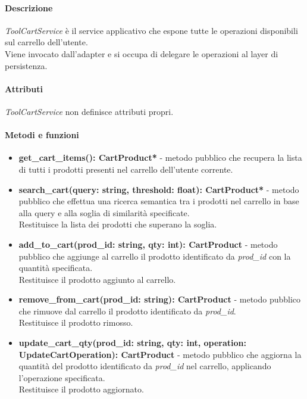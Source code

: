 \paragraph{Descrizione}
\textit{ToolCartService} è il service applicativo che espone tutte le operazioni disponibili sul carrello dell'utente.\\
Viene invocato dall'adapter e si occupa di delegare le operazioni al layer di persistenza.

\paragraph{Attributi}
\textit{ToolCartService} non definisce attributi propri.

\paragraph{Metodi e funzioni}
\begin{itemize}
	\item \textbf{get\_cart\_items(): CartProduct*} - metodo pubblico che recupera la lista di tutti i prodotti presenti nel carrello dell'utente corrente.
	\item \textbf{search\_cart(query: string, threshold: float): CartProduct*} - metodo pubblico che effettua una ricerca semantica tra i prodotti nel carrello in base alla query e alla soglia di similarità specificate.\\
	Restituisce la lista dei prodotti che superano la soglia.
	\item \textbf{add\_to\_cart(prod\_id: string, qty: int): CartProduct} - metodo pubblico che aggiunge al carrello il prodotto identificato da \textit{prod\_id} con la quantità specificata.\\
	Restituisce il prodotto aggiunto al carrello.
	\item \textbf{remove\_from\_cart(prod\_id: string): CartProduct} - metodo pubblico che rimuove dal carrello il prodotto identificato da \textit{prod\_id}.\\
	Restituisce il prodotto rimosso.
	\item \textbf{update\_cart\_qty(prod\_id: string, qty: int, operation: UpdateCartOperation): CartProduct} - metodo pubblico che aggiorna la quantità del prodotto identificato da \textit{prod\_id} nel carrello, applicando l'operazione specificata.\\
	Restituisce il prodotto aggiornato.
\end{itemize}

